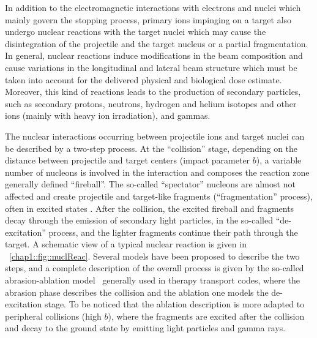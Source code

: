 In addition to the electromagnetic interactions with electrons and nuclei   which mainly govern the stopping process, primary ions impinging on a target also undergo nuclear reactions with the target nuclei which may cause the disintegration of the projectile and the target nucleus or a partial fragmentation. In general, nuclear reactions induce modifications in the beam composition and cause variations in the longitudinal and lateral beam structure which must be taken into account for the delivered physical and biological dose estimate. Moreover, this kind of reactions leads to the production of secondary particles, such as secondary protons, neutrons, hydrogen and helium isotopes and other ions (mainly with heavy ion irradiation), and gammas.

The nuclear interactions occurring between projectile ions and target nuclei can be described by a two-step process. At the \enquote{collision} stage, depending on the distance between projectile and target centers (impact parameter $b$), a variable number of nucleons is involved in the interaction and composes the reaction zone generally defined \enquote{fireball}. The so-called \enquote{spectator} nucleons are almost not affected and create projectile and target-like fragments (\enquote{fragmentation} process), often in excited states . After the collision, the excited fireball and fragments decay through the emission of secondary light particles, in the so-called \enquote{de-excitation} process, and the lighter fragments continue their path through the target. A schematic view of a typical nuclear reaction is given in \figurename~\ref{chap1::fig::nuclReac}. 
Several models have been proposed to describe the two steps, and a complete description of the overall process is given by the so-called abrasion-ablation model~\parencite{Serber1947, Hufner1975} generally used in therapy transport codes, where the abrasion phase describes the collision and the ablation one models the de-excitation stage. To be noticed that the ablation description is more adapted to peripheral collisions (high $b$), where the fragments are excited after the collision and decay to the ground state by emitting light particles and gamma rays.%

